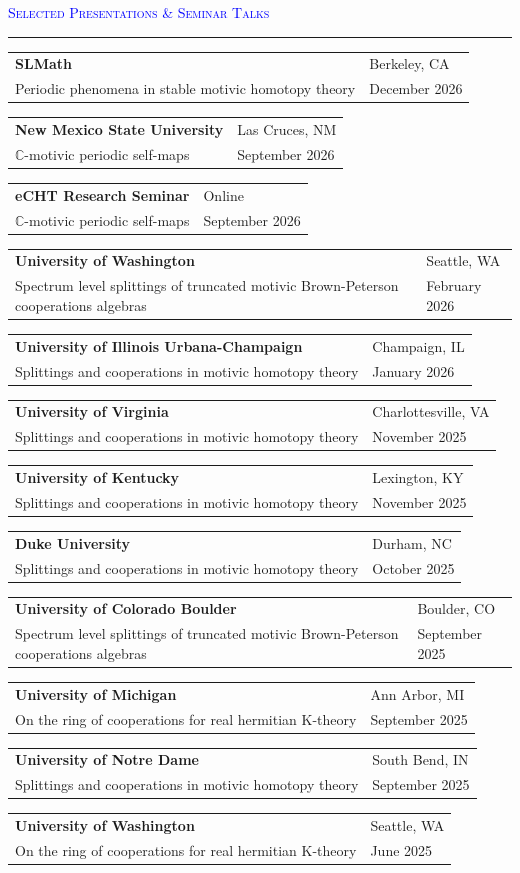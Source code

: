 \documentclass[10pt]{article}
\makeatletter
\newcommand{\grey}[1]{\textcolor{cvgrey}{#1}}
\newcommand{\altarray}[1]{
    \begin{tabular}{>{\raggedright\arraybackslash}p{13cm} @{\hskip 1cm} >{\raggedleft\arraybackslash}p{3.25cm}}
    #1
    \end{tabular}
}
\newenvironment{rSection}[1]{ %
  \medskip
  {\large\scshape\textcolor{Blue}{#1}} %
  \smallskip
  \hrule %
  \begin{list}{}{ %
    \setlength{\leftmargin}{0em} %
  }
  \item[]
}{
  \end{list}
}
\makeatother
\begin{document}
\begin{rSection}{Selected Presentations \& Seminar Talks}
\altarray{
    \textbf{SLMath} & \footnotesize Berkeley, CA\\
    \grey{Periodic phenomena in stable motivic homotopy theory} & \footnotesize \grey{December 2026}
}
\altarray{
    \textbf{New Mexico State University} & \footnotesize Las Cruces, NM\\
    \grey{$\mathbb{C}$-motivic periodic self-maps} & \footnotesize \grey{September 2026}
}
\altarray{
    \textbf{eCHT Research Seminar} & \footnotesize Online\\
    \grey{$\mathbb{C}$-motivic periodic self-maps} & \footnotesize \grey{September 2026} 
}   
\altarray{
    \textbf{University of Washington}  & \footnotesize Seattle, WA\\
    \grey{Spectrum level splittings of truncated motivic Brown-Peterson cooperations algebras} & \footnotesize \grey{February 2026}
}
\altarray{
    \textbf{University of Illinois Urbana-Champaign} & \footnotesize Champaign, IL\\
    \grey{Splittings and cooperations in motivic homotopy theory} & \footnotesize \grey{January 2026}
}
\altarray{
    \textbf{University of Virginia}  & \footnotesize Charlottesville, VA\\
    \grey{Splittings and cooperations in motivic homotopy theory} & \footnotesize \grey{November 2025}
}
\altarray{
    \textbf{University of Kentucky}  & \footnotesize Lexington, KY\\
    \grey{Splittings and cooperations in motivic homotopy theory} & \footnotesize \grey{November 2025}
}
\altarray{
    \textbf{Duke University}  & \footnotesize Durham, NC \\
    \grey{Splittings and cooperations in motivic homotopy theory} & 
    \footnotesize \grey{October 2025}
}
\altarray{
    \textbf{University of Colorado Boulder}  & \footnotesize Boulder, CO \\
    \grey{Spectrum level splittings of truncated motivic Brown-Peterson cooperations algebras} & \footnotesize \grey{September 2025}
}
\altarray{
    \textbf{University of Michigan}  & \footnotesize Ann Arbor, MI\\
    \grey{On the ring of cooperations for real hermitian K-theory} & \footnotesize \grey{September 2025} 
}
\altarray{ 
    \textbf{University of Notre Dame}  & \footnotesize South Bend, IN \\
    \grey{Splittings and cooperations in motivic homotopy theory} & \footnotesize \grey{September 2025 }
}
\altarray{
    \textbf{University of Washington}  & \footnotesize Seattle, WA \\
    \grey{On the ring of cooperations for real hermitian K-theory} & \footnotesize \grey{June 2025}
}


\end{rSection}
\end{document}
